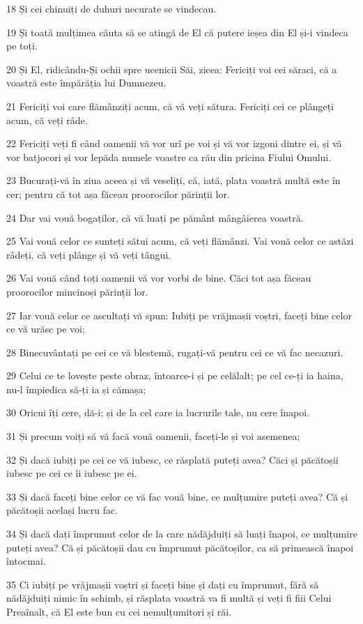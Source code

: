 \par 18 Și cei chinuiți de duhuri necurate se vindecau.
\par 19 Și toată mulțimea căuta să se atingă de El că putere ieșea din El și-i vindeca pe toți.
\par 20 Și El, ridicându-Și ochii spre ucenicii Săi, zicea: Fericiți voi cei săraci, că a voastră este împărăția lui Dumnezeu.
\par 21 Fericiți voi care flămânziți acum, că vă veți sătura. Fericiți cei ce plângeți acum, că veți râde.
\par 22 Fericiți veți fi când oamenii vă vor urî pe voi și vă vor izgoni dintre ei, și vă vor batjocori și vor lepăda numele voastre ca rău din pricina Fiului Omului.
\par 23 Bucurați-vă în ziua aceea și vă veseliți, că, iată, plata voastră multă este în cer; pentru că tot așa făceau proorocilor părinții lor.
\par 24 Dar vai vouă bogaților, că vă luați pe pământ mângâierea voastră.
\par 25 Vai vouă celor ce sunteți sătui acum, că veți flămânzi. Vai vouă celor ce astăzi râdeți, că veți plânge și vă veți tângui.
\par 26 Vai vouă când toți oamenii vă vor vorbi de bine. Căci tot așa făceau proorocilor mincinoși părinții lor.
\par 27 Iar vouă celor ce ascultați vă spun: Iubiți pe vrăjmașii voștri, faceți bine celor ce vă urăsc pe voi;
\par 28 Binecuvântați pe cei ce vă blestemă, rugați-vă pentru cei ce vă fac necazuri.
\par 29 Celui ce te lovește peste obraz, întoarce-i și pe celălalt; pe cel ce-ți ia haina, nu-l împiedica să-ți ia și cămașa;
\par 30 Oricui îți cere, dă-i; și de la cel care ia lucrurile tale, nu cere înapoi.
\par 31 Și precum voiți să vă facă vouă oamenii, faceți-le și voi asemenea;
\par 32 Și dacă iubiți pe cei ce vă iubesc, ce răsplată puteți avea? Căci și păcătoșii iubesc pe cei ce îi iubesc pe ei.
\par 33 Și dacă faceți bine celor ce vă fac vouă bine, ce mulțumire puteți avea? Că și păcătoșii același lucru fac.
\par 34 Și dacă dați împrumut celor de la care nădăjduiți să luați înapoi, ce mulțumire puteți avea? Că și păcătoșii dau cu împrumut păcătoșilor, ca să primească înapoi întocmai.
\par 35 Ci iubiți pe vrăjmașii voștri și faceți bine și dați cu împrumut, fără să nădăjduiți nimic în schimb, și răsplata voastră va fi multă și veți fi fiii Celui Preaînalt, că El este bun cu cei nemulțumitori și răi.
